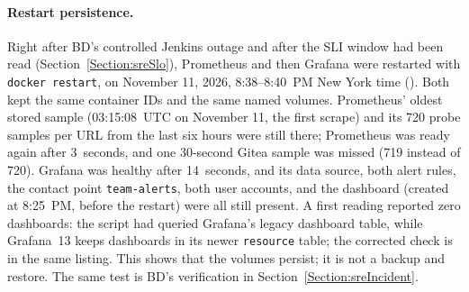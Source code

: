 \paragraph{Restart persistence.} Right after BD's controlled Jenkins outage and after the SLI window had been read
(Section~\ref{Section:sreSlo}), Prometheus and then Grafana were restarted with \texttt{docker restart}, on November 11,
2026, 8:38--8:40~PM New York time (). Both kept the same container IDs and the same named volumes. Prometheus'
oldest stored sample (03:15:08~UTC on November 11, the first scrape) and its 720 probe samples per URL from the last six
hours were still there; Prometheus was ready again after 3~seconds, and one 30-second Gitea sample was missed (719 instead
of 720). Grafana was healthy after 14~seconds, and its data source, both alert rules, the contact point
\texttt{team-alerts}, both user accounts, and the dashboard (created at 8:25~PM, before the restart) were all still
present. A first reading reported zero dashboards: the script had queried Grafana's legacy dashboard table, while
Grafana~13 keeps dashboards in its newer \texttt{resource} table; the corrected check is in the same listing. This shows
that the volumes persist; it is not a backup and restore. The same test is BD's verification in
Section~\ref{Section:sreIncident}.

\begin{longlisting}
\inputminted[fontsize=\scriptsize]{text}{evidence/110-server-baseline-before-monitoring-sd-2026-11-10.txt}
\caption{Baseline before monitoring: instance type, memory and swap, disk, containers, listening ports, November 10, 2026 (real output).}
\label{Listing:E110}
\end{longlisting}

\begin{longlisting}
\inputminted[fontsize=\scriptsize]{text}{evidence/140-capacity-decision-resize-t3-small-and-baseline-after-bd-2026-11-10.txt}
\caption{Capacity decision by BD: resize from \texttt{t3.micro} to \texttt{t3.small} and the host afterwards, November 10, 2026 (real output, BD's evidence).}
\label{Listing:E140}
\end{longlisting}

\begin{longlisting}
\inputminted[fontsize=\scriptsize]{text}{evidence/111-image-tags-digests-amd64-and-local-config-validation-sd-2026-11-10.txt}
\caption{Chosen tags with index and linux/amd64 digests, and local validation of the configuration, November 10, 2026 (real output).}
\label{Listing:E111}
\end{longlisting}

